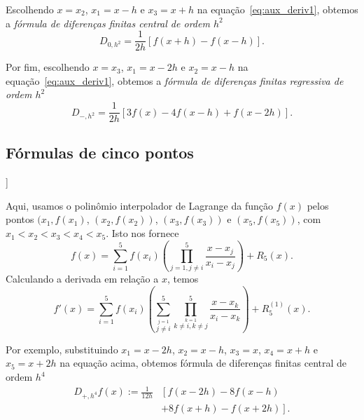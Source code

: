 Escolhendo $x=x_2$, $x_1=x-h$ e $x_3=x+h$ na equação~\eqref{eq:aux_deriv1}, obtemos a \emph{fórmula de diferenças finitas central de ordem $h^2$}
\begin{equation}
  D_{0,h^2} = \frac{1}{2 h} \left[f{\left (x + h \right )} - f{\left (x - h \right )}\right].
\end{equation}

Por fim, escolhendo $x=x_3$, $x_1=x-2h$ e $x_2=x-h$ na equação~\eqref{eq:aux_deriv1}, obtemos a \emph{fórmula de diferenças finitas regressiva de ordem $h^2$}
\begin{equation}
  D_{-,h^2} = \frac{1}{2 h} \left[3 f{\left (x \right )} - 4 f{\left (x - h \right )}  + f{\left (x - 2 h\right )}\right].
\end{equation}

\subsection{Fórmulas de cinco pontos}

\begin{flushleft}
  [[tag:revisar]]
\end{flushleft}

Aqui, usamos o polinômio interpolador de Lagrange da função $f(x)$ pelos pontos $(x_1, f(x_1)$, $(x_2, f(x_2))$, $(x_3, f(x_3))$ e $(x_5, f(x_5))$, com $x_1 < x_2 < x_3 < x_4 < x_5$. Isto nos fornece
\begin{equation}
  f(x) = \sum_{i=1}^5 f(x_i)\left(\prod_{j=1, j\neq i}^{5} \frac{x-x_j}{x_i-x_j}\right) + R_5(x).
\end{equation}
Calculando a derivada em relação a $x$, temos
\begin{equation}\label{eq:aux_deriv2}
  f'(x) = \sum_{i=1}^5 f(x_i)\left(\sum_{\overset{j=1}{j\neq i}}^5\prod_{\overset{k=1}{k\neq i, k\neq j}}^{5} \frac{x-x_k}{x_i-x_k}\right) + R^{(1)}_5(x).
\end{equation}

Por exemplo, substituindo $x_1=x-2h$, $x_2=x-h$, $x_3=x$, $x_4=x+h$ e $x_5=x+2h$ na equação acima, obtemos fórmula de diferenças finitas central de ordem $h^4$
\begin{align}
  D_{+,h^4}f(x) := \frac{1}{12h} &\left[f{\left (x - 2 h\right )} - 8 f{\left(x - h \right )} \right. \nonumber \\
  &+ \left. 8 f{\left (x + h \right )} - f{\left (x + 2 h \right )}\right].\label{eq:dfc_5pts}
\end{align}


